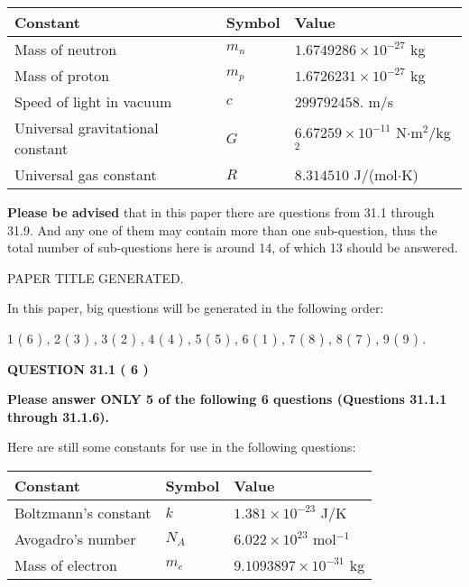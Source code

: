 \documentclass[12pt]{article}
\begin{document}
 
\noindent\begin{tabular}{|l|l|l|}
\hline
Constant & Symbol & Value \\
\hline
Mass of neutron &
$m_n$ &
 $ 1.6749286 \times 10^{-27} $
kg \\
\hline
Mass of proton &
$m_p$ &
 $ 1.6726231 \times 10^{-27} $
kg \\
\hline
Speed of light in vacuum &
$c$ &
 $ 299792458. $
m/s \\
\hline
Universal gravitational constant &
$G$ &
 $ 6.67259 \times 10^{-11} $
N$\cdot $m$^2$/kg$^2$ \\
\hline
Universal gas constant &
$R$ &
 $ 8.314510 $
J/(mol$\cdot $K) \\
\hline
\end{tabular}
 
 
{\textbf{\large{Please be advised}}} that in this paper there are questions from
31.1 through
31.9.
And any one of them may contain more than one sub-question, thus the total number
of sub-questions here is around 14, of which
13 should be answered.
 
\vspace{0.3in}
 
 
   
   
 PAPER TITLE GENERATED.
   
   
   
\vspace{0.2in}
   
In this paper, big questions will be generated in the following order: 
   
   
             1 (           6 )
 ,
             2 (           3 )
 ,
             3 (           2 )
 ,
             4 (           4 )
 ,
             5 (           5 )
 ,
             6 (           1 )
 ,
             7 (           8 )
 ,
             8 (           7 )
 ,
             9 (           9 )
 .
  
\vspace{0.2in}
  
{\textbf{\Large{QUESTION
31.1 
 (           6 )
}}}
  
  
 
{\textbf{\Large{Please answer ONLY
5 of the following
6 questions (Questions
31.1.1 through
31.1.6). }}}
 
Here are still some constants for use in the following questions:
 
 
\noindent\begin{tabular}{|l|l|l|}
\hline
Constant & Symbol & Value \\
\hline
 
Boltzmann's constant &
$k$ &
 $ 1.381 \times 10^{-23} $
J/K \\
\hline
 
Avogadro's number &
$N_A$ &
 $ 6.022 \times 10^{23} $
mol$^{-1}$ \\
\hline
 
Mass of electron &
$m_e$ &
 $ 9.1093897 \times 10^{-31} $
kg \\
\hline
 
\end{tabular}
 
\end{document}
